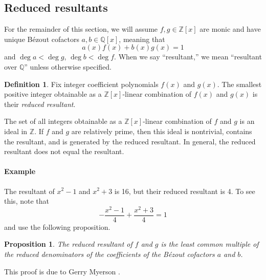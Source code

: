 \documentclass[]{article}
\newtheorem{proposition}{Proposition}[section]
\theoremstyle{definition}
\newtheorem{definition}{Definition}
\begin{document}
\subsection{Reduced resultants}

For the remainder of this section, we will assume $f, g \in \mathbb{Z}[x]$ are
monic and have unique B\'ezout cofactors $a, b \in \mathbb{Q}[x]$,
meaning that
\begin{equation*}
    a(x) f(x) + b(x) g(x) = 1
\end{equation*}
and $\deg a < \deg g$, $\deg b < \deg f$. When we say ``resultant,'' we mean
``resultant over $\mathbb{Q}$'' unless otherwise specified.

\begin{definition}
    Fix integer coefficient polynomials $f(x)$ and $g(x)$. The smallest positive
    integer obtainable as a $\mathbb{Z}[x]$-linear combination of $f(x)$ and
    $g(x)$ is their \emph{reduced resultant}.
\end{definition}

The set of all integers obtainable as a $\mathbb{Z}[x]$-linear combination of
$f$ and $g$ is an ideal in $\mathbb{Z}$. If $f$ and $g$ are relatively prime,
then this ideal is nontrivial, contains the resultant, and is generated by the
reduced resultant. In general, the reduced resultant does not equal the
resultant.

\paragraph{Example} The resultant of $x^2 - 1$ and $x^2 + 3$ is 16, but their
reduced resultant is 4. To see this, note that
\begin{equation*}
    -\frac{x^2 - 1}{4} + \frac{x^2 + 3}{4} = 1
\end{equation*}
and use the following proposition.

\begin{proposition}
    The reduced resultant of $f$ and $g$ is the least common multiple of the
    reduced denominators of the coefficients of the B\'ezout cofactors $a$
    and $b$.
\end{proposition}

This proof is due to Gerry Myerson \cite{myerson}.
\end{document}
